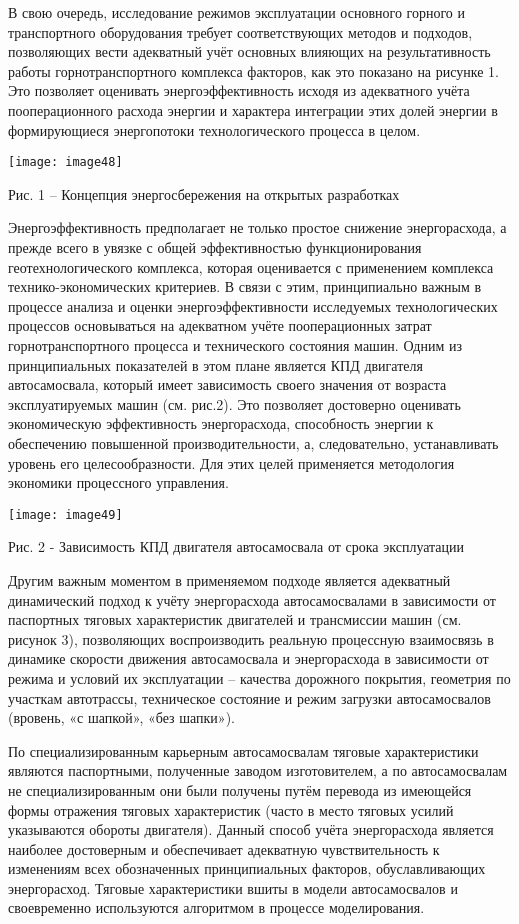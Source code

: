 В свою очередь, исследование режимов эксплуатации основного горного и
транспортного оборудования требует соответствующих методов и подходов,
позволяющих вести адекватный учёт основных влияющих на результативность
работы горнотранспортного комплекса факторов, как это показано на
рисунке 1. Это позволяет оценивать энергоэффективность исходя из
адекватного учёта пооперационного расхода энергии и характера интеграции
этих долей энергии в формирующиеся энергопотоки технологического
процесса в целом.

\texttt{[image: image48]}

Рис. 1 -- Концепция энергосбережения на открытых разработках

Энергоэффективность предполагает не только простое снижение
энергорасхода, а прежде всего в увязке с общей эффективностью
функционирования геотехнологического комплекса, которая оценивается с
применением комплекса технико-экономических критериев. В связи с этим,
принципиально важным в процессе анализа и оценки энергоэффективности
исследуемых технологических процессов основываться на адекватном учёте
пооперационных затрат горнотранспортного процесса и технического
состояния машин. Одним из принципиальных показателей в этом плане
является КПД двигателя автосамосвала, который имеет зависимость своего
значения от возраста эксплуатируемых машин (см. рис.2). Это позволяет
достоверно оценивать экономическую эффективность энергорасхода,
способность энергии к обеспечению повышенной производительности, а,
следовательно, устанавливать уровень его целесообразности. Для этих
целей применяется методология экономики процессного управления.

\texttt{[image: image49]}

Рис. 2 - Зависимость КПД двигателя автосамосвала от срока эксплуатации

Другим важным моментом в применяемом подходе является адекватный
динамический подход к учёту энергорасхода автосамосвалами в зависимости
от паспортных тяговых характеристик двигателей и трансмиссии машин (см.
рисунок 3), позволяющих воспроизводить реальную процессную взаимосвязь в
динамике скорости движения автосамосвала и энергорасхода в зависимости
от режима и условий их эксплуатации -- качества дорожного покрытия,
геометрия по участкам автотрассы, техническое состояние и режим загрузки
автосамосвалов (вровень, «с шапкой», «без шапки»).

По специализированным карьерным автосамосвалам тяговые характеристики
являются паспортными, полученные заводом изготовителем, а по
автосамосвалам не специализированным они были получены путём перевода из
имеющейся формы отражения тяговых характеристик (часто в место тяговых
усилий указываются обороты двигателя). Данный способ учёта энергорасхода
является наиболее достоверным и обеспечивает адекватную чувствительность
к изменениям всех обозначенных принципиальных факторов, обуславливающих
энергорасход. Тяговые характеристики вшиты в модели автосамосвалов и
своевременно используются алгоритмом в процессе моделирования.

